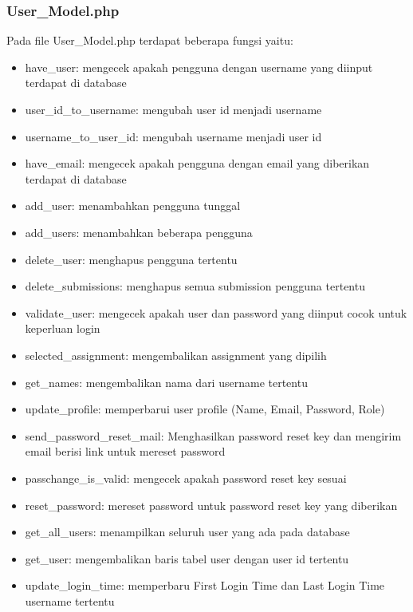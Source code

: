 \subsubsection{User\_Model.php}
Pada file User\_Model.php terdapat beberapa fungsi yaitu:
\begin{itemize}
	\item have\_user: mengecek apakah pengguna dengan username yang diinput terdapat di database
	\item user\_id\_to\_username: mengubah user id menjadi username
	\item username\_to\_user\_id: mengubah username menjadi user id
	\item have\_email: mengecek apakah pengguna dengan email yang diberikan terdapat di database
	\item add\_user: menambahkan pengguna tunggal
	\item add\_users: menambahkan beberapa pengguna
	\item delete\_user: menghapus pengguna tertentu
	\item delete\_submissions: menghapus semua submission pengguna tertentu
	\item validate\_user: mengecek apakah user dan password yang diinput cocok untuk keperluan login
	\item selected\_assignment: mengembalikan assignment yang dipilih
	\item get\_names: mengembalikan nama dari username tertentu
	\item update\_profile: memperbarui user profile (Name, Email, Password, Role)
	\item send\_password\_reset\_mail: Menghasilkan password reset key dan mengirim email berisi link untuk mereset password
	\item passchange\_is\_valid: mengecek apakah password reset key sesuai
	\item reset\_password: mereset password untuk password reset key yang diberikan
	\item get\_all\_users: menampilkan seluruh user yang ada pada database
	\item get\_user: mengembalikan baris tabel user dengan user id tertentu
	\item update\_login\_time: memperbaru First Login Time dan Last Login Time username tertentu	
\end{itemize}

